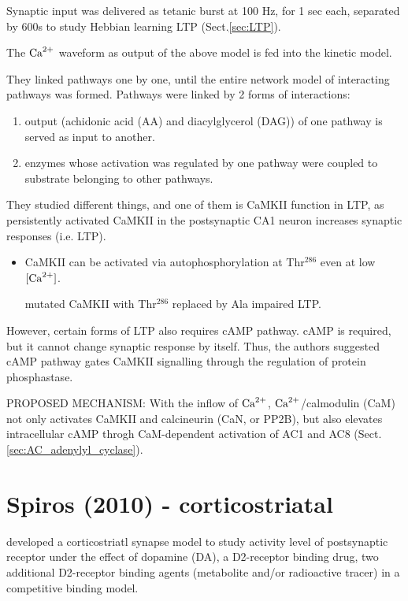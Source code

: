 Synaptic input was delivered as tetanic burst at 100 Hz, for 1 sec each,
separated by 600s to study Hebbian learning LTP (Sect.\ref{sec:LTP}).

The ${\text{Ca}^{2+}}$ waveform as output of the above model is fed into the kinetic model.


They linked pathways one by one, until the entire network model of interacting
pathways was formed. Pathways were linked by 2 forms of interactions:
\begin{enumerate}
  \item output (achidonic acid (AA) and diacylglycerol (DAG)) of one pathway is
  served as input to another.
  
  \item enzymes whose activation was regulated by one pathway were coupled to
  substrate belonging to other pathways.
\end{enumerate}

They studied different things, and one of them is CaMKII function in LTP, 
as persistently activated CaMKII in the postsynaptic CA1 neuron increases
synaptic responses (i.e. LTP).
\begin{itemize}
  \item CaMKII can be activated via autophosphorylation at Thr$^{286}$ even at
  low $[{\text{Ca}^{2+}}]$.
  
mutated CaMKII with Thr$^{286}$ replaced by Ala impaired LTP.   
\end{itemize}
However, certain forms of LTP also requires cAMP pathway.
cAMP is required, but it cannot change synaptic response by itself.
Thus, the authors suggested cAMP pathway gates CaMKII signalling through the
regulation of protein phosphastase.

PROPOSED MECHANISM: With the inflow of ${\text{Ca}^{2+}}$, ${\text{Ca}^{2+}}$/calmodulin (CaM) not only
activates CaMKII and calcineurin (CaN, or PP2B), but also elevates intracellular
cAMP throgh CaM-dependent activation of AC1 and AC8
(Sect.\ref{sec:AC_adenylyl_cyclase}).


\section{Spiros (2010) - corticostriatal}
\label{sec:Spiros-2010}

\citep{spiros2010} developed a corticostriatl synapse model 
to study activity level of postsynaptic receptor under the effect of dopamine
(DA), a D2-receptor binding drug, two additional D2-receptor binding agents
(metabolite and/or radioactive tracer) in a competitive binding model.

